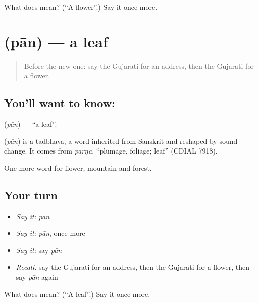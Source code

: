 \begin{tcolorbox}[breakable,colback=teal!4,colframe=teal!35!black,title={Before you move on}]
What does  mean? (\textquotedblleft{}A flower\textquotedblright{}.) Say it once more.
\end{tcolorbox}
\section[\texorpdfstring{\gu{પાન} (pān)}{પાન (pān)}]{ (pān) — a leaf}

\label{lesson:GU-C64-leaf}



\begin{quote}
Before the new one: say the Gujarati for an address, then the Gujarati for a flower.
\end{quote}

\subsection*{You'll want to know: }
\textbf{} (\emph{pān}) — \textquotedblleft{}a leaf\textquotedblright{}.

\begin{cousinweb}
\textbf{} (\emph{pān}) is a tadbhava, a word inherited from Sanskrit and reshaped by sound change. It comes from \emph{parṇa}, \textquotedblleft{}plumage, foliage; leaf\textquotedblright{} (CDIAL 7918).
\end{cousinweb}

\begin{grammarlens}[title={What you've built}]
One more word for flower, mountain and forest.
\end{grammarlens}

\subsection*{Your turn}
\begin{itemize}
\raggedright
  \item \emph{Say it:} \emph{pān}
  \item \emph{Say it:} \emph{pān}, once more
  \item \emph{Say it:} say \emph{pān}
  \item \emph{Recall:} say the Gujarati for an address, then the Gujarati for a flower, then say \emph{pān} again
\end{itemize}

\begin{tcolorbox}[breakable,colback=teal!4,colframe=teal!35!black,title={Before you move on}]
What does  mean? (\textquotedblleft{}A leaf\textquotedblright{}.) Say it once more.
\end{tcolorbox}
